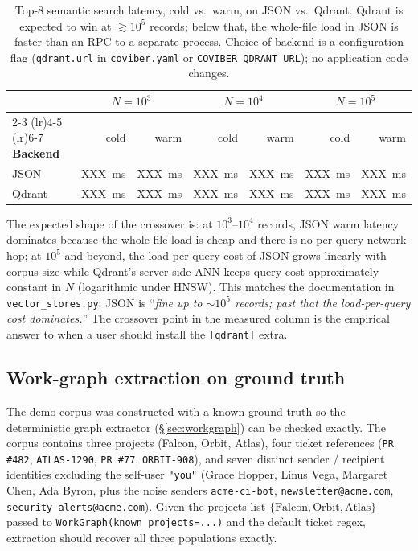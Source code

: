 \begin{table}[h]
\centering
\small
\begin{tabular}{lrrrrrr}
\toprule
 & \multicolumn{2}{c}{\textbf{$N{=}10^{3}$}} & \multicolumn{2}{c}{\textbf{$N{=}10^{4}$}} & \multicolumn{2}{c}{\textbf{$N{=}10^{5}$}} \\
\cmidrule(lr){2-3} \cmidrule(lr){4-5} \cmidrule(lr){6-7}
\textbf{Backend} & cold & warm & cold & warm & cold & warm \\
\midrule
JSON   & \SI{XXX}{\milli\second} & \SI{XXX}{\milli\second} & \SI{XXX}{\milli\second} & \SI{XXX}{\milli\second} & \SI{XXX}{\milli\second} & \SI{XXX}{\milli\second} \\
Qdrant & \SI{XXX}{\milli\second} & \SI{XXX}{\milli\second} & \SI{XXX}{\milli\second} & \SI{XXX}{\milli\second} & \SI{XXX}{\milli\second} & \SI{XXX}{\milli\second} \\
\bottomrule
\end{tabular}
\caption{Top-8 semantic search latency, cold vs.\ warm, on JSON vs.\ Qdrant.
Qdrant is expected to win at $\gtrsim 10^{5}$ records; below that, the whole-file
load in JSON is faster than an RPC to a separate process. Choice of backend
is a configuration flag (\texttt{qdrant.url} in \texttt{coviber.yaml} or
\texttt{COVIBER\_QDRANT\_URL}); no application code changes.}
\label{tab:jsonvsqdrant}
\end{table}

The expected shape of the crossover is: at $10^{3}$--$10^{4}$ records, JSON
warm latency dominates because the whole-file load is cheap and there is no
per-query network hop; at $10^{5}$ and beyond, the load-per-query cost of
JSON grows linearly with corpus size while Qdrant's server-side ANN keeps
query cost approximately constant in $N$ (logarithmic under HNSW). This
matches the documentation in \texttt{vector\_stores.py}: JSON is
``\emph{fine up to $\sim\!10^{5}$ records; past that the load-per-query cost
dominates.}'' The crossover point in the measured column is the empirical
answer to when a user should install the \texttt{[qdrant]} extra.

\subsection{Work-graph extraction on ground truth}
\label{sec:eval-workgraph}

The demo corpus was constructed with a known ground truth so the deterministic
graph extractor (\S\ref{sec:workgraph}) can be checked exactly. The corpus
contains three projects (Falcon, Orbit, Atlas), four ticket references
(\texttt{PR \#482}, \texttt{ATLAS-1290}, \texttt{PR \#77}, \texttt{ORBIT-908}),
and seven distinct sender / recipient identities excluding the self-user
\texttt{"you"} (Grace Hopper, Linus Vega, Margaret Chen, Ada Byron, plus the
noise senders \texttt{acme-ci-bot}, \texttt{newsletter@acme.com},
\texttt{security-alerts@acme.com}). Given the projects list
$\{\text{Falcon}, \text{Orbit}, \text{Atlas}\}$ passed to
\texttt{WorkGraph(known\_projects=...)} and the default ticket regex, extraction
should recover all three populations exactly.

